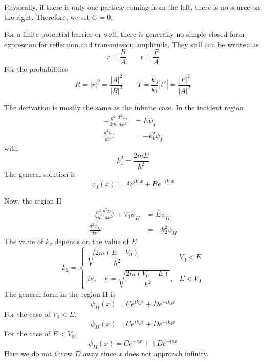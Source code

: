 \documentclass[../../../main.tex]{subfiles}
\begin{document}
Physically, if there is only one particle coming from the left, there is no source on the right.
Therefore, we set $G=0$.

For a finite potential barrier or well, there is generally no simple closed-form expression for reflection and transmission amplitude.
They still can be written as
\begin{equation*}
  r=\frac{B }{A }\qquad t=\frac{F }{A}
\end{equation*}
For the probabilities
\begin{equation*}
  R=|r|^2=\frac{|A|^2}{|B|^2}\qquad T=\frac{k_3 }{k_1 }|t^2|=\frac{|F|^2}{|A|^2}
\end{equation*}

The derivation is mostly the same as the infinite case.
In the incident region
\begin{align*}
  -\frac{\hbar^2}{2m} \frac{d^2 \psi_{I}}{dx^2} & =  E \psi_I        \\
  \frac{d^2 \psi_{I}}{dx^2}                     & = - k_1^2 \psi_{I}
\end{align*}
with
\begin{equation*}
  k_1^2 =\frac{2 m E}{\hbar^2}
\end{equation*}
The general solution is
\begin{equation*}
  \psi_I(x) = A e^{i k_1 x} + B e^{-i k_1 x}
\end{equation*}

Now, the region II
\begin{align*}
  -\frac{\hbar^2}{2m} \frac{d^2 \psi_{II}}{dx^2} + V_0 \psi_{II} & =  E \psi_{II}      \\
  \frac{d^2 \psi_{II}}{dx^2}                                     & = - k_2^2 \psi_{II}
\end{align*}
The value  of $k_2$ depends on the value of $E$
\begin{equation*}
  k_2 =
  \begin{cases}
    \sqrt{\dfrac{2 m (E - V_0)}{\hbar^2}}                           & V_0<E   \\
    i \kappa, \quad \kappa = \sqrt{\dfrac{2 m (V_0 - E)}{\hbar^2}}, & E < V_0
  \end{cases}
\end{equation*}
The general form in the region II is
\begin{equation*}
  \psi_{II}(x)=C e^{i k_2 x} + D e^{-i k_2 x}
\end{equation*}
For the case of $V_0<E$,
\begin{equation*}
  \psi_{II}(x) = C e^{i k_2 x} + D e^{-i k_2 x}
\end{equation*}
For the case of $E<V_0$,
\begin{equation*}
  \psi_{II}(x) =C e^{-\kappa x}+ + D e^{-i\kappa x}
\end{equation*}
Here we do not throw $D$ away since $x$ does not approach infinity.
\end{document}
